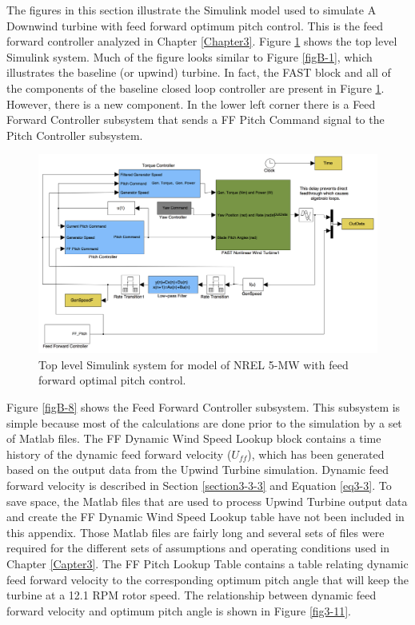 The figures in this section illustrate the Simulink model used to simulate A Downwind turbine with feed forward optimum pitch control. This is the feed forward controller analyzed in Chapter \ref{Chapter3}. Figure \ref{figB-7} shows the top level Simulink system. Much of the figure looks similar to Figure \ref{figB-1}, which illustrates the baseline (or upwind) turbine. In fact, the FAST block and all of the components of the baseline closed loop controller are present in Figure \ref{figB-7}. However, there is a new component. In the lower left corner there is a Feed Forward Controller subsystem that sends a FF Pitch Command signal to the Pitch Controller subsystem.
 
\begin{figure}[ht]
	\centering
		\includegraphics[width=\linewidth]{Figures/AppendixBFigures/FF_Pitch1.png}
	\caption{Top level Simulink system for model of NREL 5-MW with feed forward optimal pitch control.}
	\label{figB-7}
\end{figure}

Figure \ref{figB-8} shows the Feed Forward Controller subsystem. This subsystem is simple because most of the calculations are done prior to the simulation by a set of Matlab files. The FF Dynamic Wind Speed Lookup block contains a time history of the dynamic feed forward velocity ($U_{ff}$), which has been generated based on the output data from the Upwind Turbine simulation. Dynamic feed forward velocity is described in Section \ref{section3-3-3} and Equation \ref{eq3-3}. To save space, the Matlab files that are used to process Upwind Turbine output data and create the FF Dynamic Wind Speed Lookup table have not been included in this appendix. Those Matlab files are fairly long and several sets of files were required for the different sets of assumptions and operating conditions used in Chapter \ref{Capter3}. The FF Pitch Lookup Table contains a table relating dynamic feed forward velocity to the corresponding optimum pitch angle that will keep the turbine at a 12.1 RPM rotor speed. The relationship between dynamic feed forward velocity and optimum pitch angle is shown in Figure \ref{fig3-11}.

